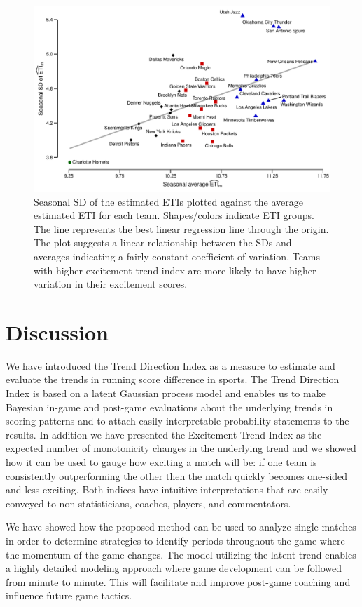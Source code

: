 \documentclass[
  11pt,
]{svjour3}
\theoremstyle{nonumberplain}
\begin{document}
\begin{figure}[htbp]
\includegraphics{fig5.pdf}
\caption{Seasonal SD of the estimated ETIs plotted against the average estimated ETI for each team. Shapes/colors indicate ETI groups. The line represents the best linear regression line through the origin. The plot suggests a linear relationship between the SDs and averages indicating a fairly constant coefficient of variation. Teams with higher excitement trend index are more likely to have higher variation in their excitement scores.}
\label{fig:linplot}
\end{figure}

\hypertarget{sec:discussion}{%
\section{Discussion}\label{sec:discussion}}

We have introduced the Trend Direction Index as a measure to estimate
and evaluate the trends in running score difference in sports. The Trend
Direction Index is based on a latent Gaussian process model and enables
us to make Bayesian in-game and post-game evaluations about the
underlying trends in scoring patterns and to attach easily interpretable
probability statements to the results. In addition we have presented the
Excitement Trend Index as the expected number of monotonicity changes in
the underlying trend and we showed how it can be used to gauge how
exciting a match will be: if one team is consistently outperforming the
other then the match quickly becomes one-sided and less exciting. Both
indices have intuitive interpretations that are easily conveyed to
non-statisticians, coaches, players, and commentators.

We have showed how the proposed method can be used to analyze single
matches in order to determine strategies to identify periods throughout
the game where the momentum of the game changes. The model utilizing the
latent trend enables a highly detailed modeling approach where game
development can be followed from minute to minute. This will facilitate
and improve post-game coaching and influence future game tactics.
\end{document}
